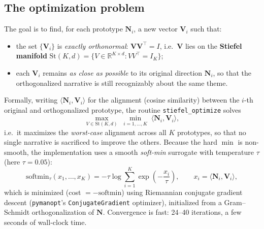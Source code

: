 \documentclass[11pt]{article}
\begin{document}
\subsection{The optimization problem}
The goal is to find, for each prototype $\mathbf{N}_i$, a new vector
$\mathbf{V}_i$ such that:
\begin{itemize}
    \item the set $\{\mathbf{V}_i\}$ is \emph{exactly orthonormal}: $\mathbf{V}\mathbf{V}^\top = I$, i.e.\ $\mathbf{V}$ lies on the \textbf{Stiefel manifold} $\mathrm{St}(K, d) = \{V \in \mathbb{R}^{K\times d} : VV^\top = I_K\}$;
    \item each $\mathbf{V}_i$ remains \emph{as close as possible} to its original direction $\mathbf{N}_i$, so that the orthogonalized narrative is still recognizably about the same theme.
\end{itemize}

Formally, writing $\langle \mathbf{N}_i, \mathbf{V}_i\rangle$ for the
alignment (cosine similarity) between the $i$-th original and orthogonalized
prototype, the routine \texttt{stiefel\_optimize} solves
\[
\max_{V \in \mathrm{St}(K,d)} \; \min_{i=1,\dots,K} \; \langle \mathbf{N}_i, \mathbf{V}_i \rangle ,
\]
i.e.\ it maximizes the \emph{worst-case} alignment across all $K$ prototypes,
so that no single narrative is sacrificed to improve the others. Because the
hard $\min$ is non-smooth, the implementation uses a smooth \emph{soft-min}
surrogate with temperature $\tau$ (here $\tau=0.05$):
\[
\text{softmin}_\tau(x_1,\dots,x_K) = -\tau \log \sum_{i=1}^K \exp\!\left(-\frac{x_i}{\tau}\right), \qquad x_i = \langle \mathbf{N}_i, \mathbf{V}_i\rangle,
\]
which is minimized (cost $= -\text{softmin}$) using Riemannian conjugate
gradient descent (\texttt{pymanopt}'s \texttt{ConjugateGradient} optimizer),
initialized from a Gram--Schmidt orthogonalization of $\mathbf{N}$. Convergence
is fast: 24--40 iterations, a few seconds of wall-clock time.
\end{document}
